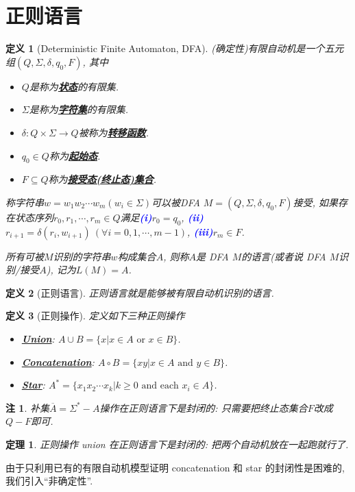 \documentclass[8pt]{article}
\theoremstyle{compact}
\newtheorem{theorem}{定理}
\newtheorem{definition}{定义}
\newtheorem{remark}{注}
\def\obj#1{\textbf{\uline{#1}}}
\def\num#1{\textnormal{\textbf{\mbox{\textcolor{blue}{(#1)}}}}}
\def\ge{\geqslant}
\begin{document}
\section{正则语言}
\begin{definition}[Deterministic Finite Automaton, DFA]
	(确定性)有限自动机是一个五元组$(Q, \Sigma, \delta, q_0, F)$, 其中
	\begin{itemize}
		\item $Q$是称为\obj{状态}的有限集. 
		\item $\Sigma$是称为\obj{字符集}的有限集. 
		\item $\delta: Q \times \Sigma \to Q$被称为\obj{转移函数}. 
		\item $q_0 \in Q$称为\obj{起始态}. 
		\item $F \subseteq Q$称为\obj{接受态(终止态)集合}. 
	\end{itemize}

	称字符串$w = w_1w_2\cdots w_m(w_i \in \Sigma)$可以被DFA $M = (Q, \Sigma, \delta, q_0, F)$接受, 如果存在状态序列$r_0, r_1, \cdots, r_m \in Q$满足\num{i}$r_0 = q_0$, \num{ii}$r_{i+1} = \delta(r_i, w_{i+1}) \ (\forall i = 0, 1, \cdots, m-1)$, \num{iii}$r_m \in F$. 

	所有可被$M$识别的字符串$w$构成集合$A$, 则称$A$是 DFA $M$的语言(或者说 DFA $M$识别/接受$A$), 记为$L(M) = A$.
\end{definition}
\begin{definition}[正则语言]
	正则语言就是能够被有限自动机识别的语言. 
\end{definition}
\begin{definition}[正则操作]
	定义如下三种正则操作
	\begin{itemize}
		\item \obj{Union}: $A \cup B = \{x | x \in A \textrm{ or } x \in B\}$.
		\item \obj{Concatenation}: $A \circ B = \{xy | x \in A \textrm{ and } y \in B\}$.
		\item \obj{Star}: $A^* = \{x_1x_2\cdots x_k | k \ge 0 \textrm{ and each } x_i \in A\}$.
	\end{itemize}
\end{definition}
\begin{remark}
	补集$\overline{A} = \Sigma^* - A$操作在正则语言下是封闭的: 只需要把终止态集合$F$改成$Q - F$即可.
\end{remark}
\begin{theorem}
	正则操作 union 在正则语言下是封闭的: 把两个自动机放在一起跑就行了. 
\end{theorem}
由于只利用已有的有限自动机模型证明 concatenation 和 star 的封闭性是困难的, 我们引入“非确定性”. 
\end{document}
